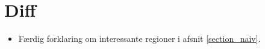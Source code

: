 {
\section*{Diff}
\begin{itemize}
    \item Færdig forklaring om interessante regioner i afsnit
        \ref{section_naiv}.
\end{itemize}
}

